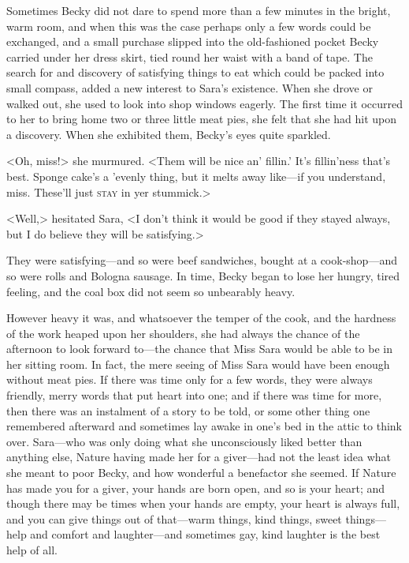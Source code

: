 Sometimes Becky did not dare to spend more than a few minutes in the bright, warm room, and when this was the case perhaps only a few words could be exchanged, and a small purchase slipped into the old-fashioned pocket Becky carried under her dress skirt, tied round her waist with a band of tape. The search for and discovery of satisfying things to eat which could be packed into small compass, added a new interest to Sara's existence. When she drove or walked out, she used to look into shop windows eagerly. The first time it occurred to her to bring home two or three little meat pies, she felt that she had hit upon a discovery. When she exhibited them, Becky's eyes quite sparkled.

<Oh, miss!> she murmured. <Them will be nice an' fillin.' It's fillin'ness that's best. Sponge cake's a 'evenly thing, but it melts away like—if you understand, miss. These'll just \textsc{stay} in yer stummick.>

<Well,> hesitated Sara, <I don't think it would be good if they stayed always, but I do believe they will be satisfying.>

They were satisfying—and so were beef sandwiches, bought at a cook-shop—and so were rolls and Bologna sausage. In time, Becky began to lose her hungry, tired feeling, and the coal box did not seem so unbearably heavy.

However heavy it was, and whatsoever the temper of the cook, and the hardness of the work heaped upon her shoulders, she had always the chance of the afternoon to look forward to—the chance that Miss Sara would be able to be in her sitting room. In fact, the mere seeing of Miss Sara would have been enough without meat pies. If there was time only for a few words, they were always friendly, merry words that put heart into one; and if there was time for more, then there was an instalment of a story to be told, or some other thing one remembered afterward and sometimes lay awake in one's bed in the attic to think over. Sara—who was only doing what she unconsciously liked better than anything else, Nature having made her for a giver—had not the least idea what she meant to poor Becky, and how wonderful a benefactor she seemed. If Nature has made you for a giver, your hands are born open, and so is your heart; and though there may be times when your hands are empty, your heart is always full, and you can give things out of that—warm things, kind things, sweet things—help and comfort and laughter—and sometimes gay, kind laughter is the best help of all.

